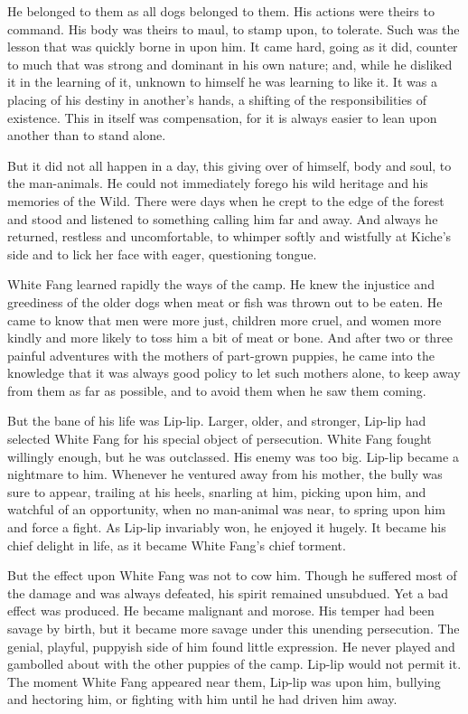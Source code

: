 \documentclass[10pt]{book}
\begin{document}
He belonged to them as all dogs belonged to them. His actions were
theirs to command. His body was theirs to maul, to stamp upon, to
tolerate. Such was the lesson that was quickly borne in upon him. It
came hard, going as it did, counter to much that was strong and
dominant in his own nature; and, while he disliked it in the learning
of it, unknown to himself he was learning to like it. It was a placing
of his destiny in another’s hands, a shifting of the responsibilities
of existence. This in itself was compensation, for it is always easier
to lean upon another than to stand alone.

But it did not all happen in a day, this giving over of himself, body
and soul, to the man-animals. He could not immediately forego his wild
heritage and his memories of the Wild. There were days when he crept to
the edge of the forest and stood and listened to something calling him
far and away. And always he returned, restless and uncomfortable, to
whimper softly and wistfully at Kiche’s side and to lick her face with
eager, questioning tongue.

White Fang learned rapidly the ways of the camp. He knew the injustice
and greediness of the older dogs when meat or fish was thrown out to be
eaten. He came to know that men were more just, children more cruel,
and women more kindly and more likely to toss him a bit of meat or
bone. And after two or three painful adventures with the mothers of
part-grown puppies, he came into the knowledge that it was always good
policy to let such mothers alone, to keep away from them as far as
possible, and to avoid them when he saw them coming.

But the bane of his life was Lip-lip. Larger, older, and stronger,
Lip-lip had selected White Fang for his special object of persecution.
White Fang fought willingly enough, but he was outclassed. His enemy
was too big. Lip-lip became a nightmare to him. Whenever he ventured
away from his mother, the bully was sure to appear, trailing at his
heels, snarling at him, picking upon him, and watchful of an
opportunity, when no man-animal was near, to spring upon him and force
a fight. As Lip-lip invariably won, he enjoyed it hugely. It became his
chief delight in life, as it became White Fang’s chief torment.

But the effect upon White Fang was not to cow him. Though he suffered
most of the damage and was always defeated, his spirit remained
unsubdued. Yet a bad effect was produced. He became malignant and
morose. His temper had been savage by birth, but it became more savage
under this unending persecution. The genial, playful, puppyish side of
him found little expression. He never played and gambolled about with
the other puppies of the camp. Lip-lip would not permit it. The moment
White Fang appeared near them, Lip-lip was upon him, bullying and
hectoring him, or fighting with him until he had driven him away.
\end{document}

